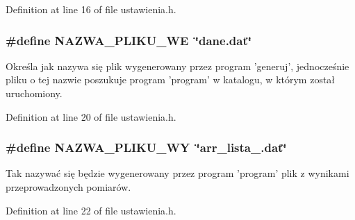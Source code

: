 Definition at line 16 of file ustawienia.\-h.

\subsubsection[{N\-A\-Z\-W\-A\-\_\-\-P\-L\-I\-K\-U\-\_\-\-W\-E}]{\setlength{\rightskip}{0pt plus 5cm}\#define N\-A\-Z\-W\-A\-\_\-\-P\-L\-I\-K\-U\-\_\-\-W\-E~\char`\"{}dane.\-dat\char`\"{}}\label{ustawienia_8h_a38a14ca65ed113a739420d7a6813c0e8}
Określa jak nazywa się plik wygenerowany przez program 'generuj', jednocześnie pliku o tej nazwie poszukuje program 'program' w katalogu, w którym został uruchomiony. 

Definition at line 20 of file ustawienia.\-h.

\subsubsection[{N\-A\-Z\-W\-A\-\_\-\-P\-L\-I\-K\-U\-\_\-\-W\-Y}]{\setlength{\rightskip}{0pt plus 5cm}\#define N\-A\-Z\-W\-A\-\_\-\-P\-L\-I\-K\-U\-\_\-\-W\-Y~\char`\"{}arr\-\_\-lista\-\_.\-dat\char`\"{}}\label{ustawienia_8h_af22a754e002d9be8ee0b6d97eb9a9882}
Tak nazywać się będzie wygenerowany przez program 'program' plik z wynikami przeprowadzonych pomiarów. 

Definition at line 22 of file ustawienia.\-h.

